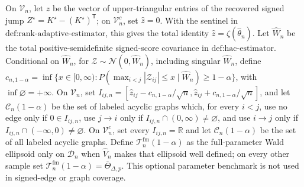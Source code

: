 On \(\mathcal V_n\), let \(\widehat z\) be the vector of upper-triangular entries of the recovered signed jump \(Z^\star=K^\star-(K^\star)^{\mathsf T}\); on \(\mathcal V_n^c\), set \(\widehat z=0\). With the sentinel in \(\text{def:rank-adaptive-estimator}\), this gives the total identity \(\widehat z=\zeta(\widehat\theta_n)\). Let \(\widehat W_n\) be the total positive-semidefinite signed-score covariance in \(\text{def:hac-estimator}\). Conditional on \(\widehat W_n\), for \(\mathcal Z\sim\mathcal N(0,\widehat W_n)\), including singular \(\widehat W_n\), define \(c_{n,1-\alpha}=\inf\{x\in[0,\infty):P(\max_{i<j}|\mathcal Z_{ij}|\leq x\mid\widehat W_n)\geq1-\alpha\}\), with \(\inf\varnothing=+\infty\). On \(\mathcal V_n\), set \(I_{ij,n}=[\widehat z_{ij}-c_{n,1-\alpha}/\sqrt n,\widehat z_{ij}+c_{n,1-\alpha}/\sqrt n]\), and let \(\mathcal C_n(1-\alpha)\) be the set of labeled acyclic graphs which, for every \(i<j\), use no edge only if \(0\in I_{ij,n}\), use \(j\to i\) only if \(I_{ij,n}\cap(0,\infty)\neq\varnothing\), and use \(i\to j\) only if \(I_{ij,n}\cap(-\infty,0)\neq\varnothing\). On \(\mathcal V_n^c\), set every \(I_{ij,n}=\mathbb R\) and let \(\mathcal C_n(1-\alpha)\) be the set of all labeled acyclic graphs. Define \(\mathcal T_n^{\mathrm{fm}}(1-\alpha)\) as the full-parameter Wald ellipsoid only on \(\mathcal D_n\) when \(\widehat V_n\) makes that ellipsoid well defined; on every other sample set \(\mathcal T_n^{\mathrm{fm}}(1-\alpha)=\overline\Theta_{\Delta,p}\). This optional parameter benchmark is not used in signed-edge or graph coverage.